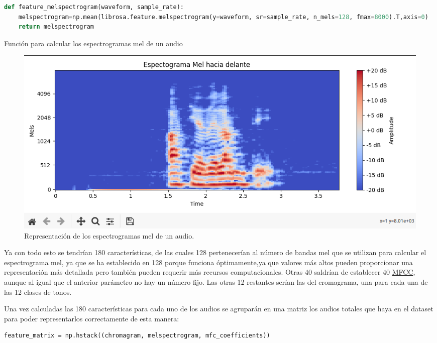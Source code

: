 \begin{code}[H]
\begin{lstlisting}[language=Python]
def feature_melspectrogram(waveform, sample_rate):
    melspectrogram=np.mean(librosa.feature.melspectrogram(y=waveform, sr=sample_rate, n_mels=128, fmax=8000).T,axis=0)
    return melspectrogram
\end{lstlisting}
\caption[Función para calcular los espectrogramas mel de un audio]{Función para calcular los espectrogramas mel de un audio}
\label{cod:codejemplo5}
\end{code}

\begin{figure}[H]
  \centering
  \includegraphics[scale=0.4]{figs/mel_spectrogram} %
  \caption{ Representación de los espectrogramas mel de un audio.}
  \label{fig:mel}
\end{figure}

Ya con todo esto se tendrían 180 características, de las cuales 128 pertenecerían al número de bandas mel que se utilizan para calcular el espectrograma mel, ya que se ha establecido en 128 porque funciona óptimamente,ya que valores más altos pueden proporcionar una representación más detallada pero también pueden requerir más recursos computacionales. Otras 40 saldrían de establecer 40 \hyperlink{MFCC}{MFCC}, aunque al igual que el anterior parámetro no hay un número fijo. Las otras 12 restantes serían las del cromagrama, una para cada una de las 12 clases de tonos.

Una vez calculadas las 180 características para cada uno de los audios se agruparán en una matriz los audios totales que haya en el dataset para poder representarlos correctamente de esta manera:

\begin{verbatim}
feature_matrix = np.hstack((chromagram, melspectrogram, mfc_coefficients))
\end{verbatim}

